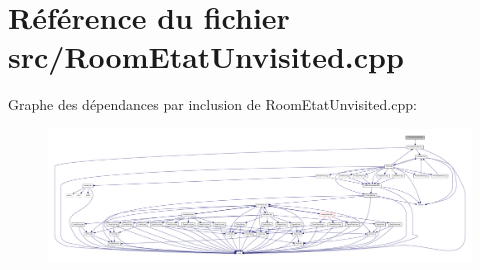 \section{Référence du fichier src/\-Room\-Etat\-Unvisited.cpp}
\label{_room_etat_unvisited_8cpp}
Graphe des dépendances par inclusion de Room\-Etat\-Unvisited.\-cpp\-:
\nopagebreak
\begin{figure}[H]
\begin{center}
\leavevmode
\includegraphics[width=350pt]{_room_etat_unvisited_8cpp__incl}
\end{center}
\end{figure}

